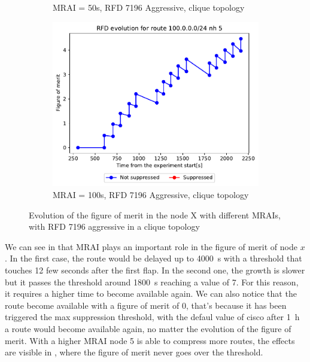 \begin{figure}[h]
\begin{subfigure}[b]{0.3\textwidth}
         \caption{MRAI = 50s, RFD 7196 Aggressive, clique topology}
         \label{fig:clique_x_mrai50_rfd7196Aggressive}
     \end{subfigure}
     \hfill
     \begin{subfigure}[b]{0.3\textwidth}
         \centering
         \includegraphics[width=\textwidth]{images/RFD/clique/FigureOfMerit/mrai21_RFD_7196_aggressive_x_rfd_R1.pdf}
         \caption{MRAI = 100s, RFD 7196 Aggressive, clique topology}
         \label{fig:clique_x_mrai100_rfd7196Aggressive}
     \end{subfigure}
        \caption{Evolution of the figure of merit in the node X with different MRAIs, with RFD 7196 aggressive in a clique topology}
        \label{fig:clique_nodex_rfd7196Aggressive}
\end{figure}

We can see in 
that \ac{MRAI} plays an important role in the figure of merit of node $x$.
In the first case, the route would be delayed up to \SI{4000}{\second} with a 
threshold that touches \num{12} few seconds after the first flap.
In the second one, the growth is slower but it passes the threshold around
\SI{1800}{\second} reaching a value of \num{7}.
For this reason, it requires a higher time to become available again.
We can also notice that the route become available with a figure of merit of 
\num{0}, that's because it has been triggered the max suppression threshold, 
with the defaul value of cisco after \SI{1}{\hour} a route would become available
again, no matter the evolution of the figure of merit.
With a higher \ac{MRAI} node \num{5} is able to compress more routes, the effects
are visible in , where the figure of
merit never goes over the threshold.
 
